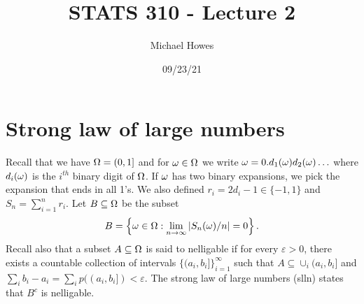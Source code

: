 




\title{STATS 310 - Lecture 2}
\author{Michael Howes}
\date{09/23/21}

\pagestyle{fancy}
\fancyhf{}


\maketitle
\section{Strong law of large numbers}
Recall that we have ${{\Omega}} = (0,1]$ and for ${\omega} \in {{\Omega}}$ we write ${\omega} = 0.d_1({\omega})d_2({\omega})\ldots$ where $d_i({\omega})$ is the $i^{th}$ binary digit of ${{\Omega}}$. If ${\omega}$ has two binary expansions, we pick the expansion that ends in all 1's. We also defined $r_i = 2d_i -1 \in \{-1,1\}$ and $S_n = \sum_{i=1}^n r_i$. Let $B \subseteq {{\Omega}}$ be the subset
\[B = \left\{{\omega} \in {{\Omega}} : \lim_{n \to \infty}{\left\lvert S_n({\omega})/n\right\rvert} = 0 \right\}.   \]
Recall also that a subset $A \subseteq {{\Omega}}$ is said to nelligable if for every $\varepsilon >0$, there exists a countable collection of intervals $\{(a_i,b_i]\}_{i=1}^\infty$ such that $A \subseteq \cup_i (a_i,b_i]$ and $\sum_i b_i-a_i = \sum_i p((a_i,b_i]) < \varepsilon$. The strong law of large numbers (slln) states that $B^c$ is nelligable.
